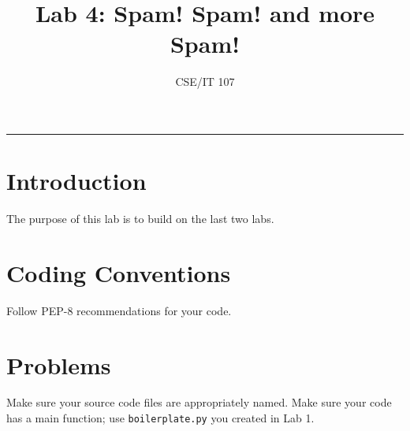 \documentclass[12pt]{article}
\title{Lab 4: Spam! Spam! and more Spam!}
\author{CSE/IT 107}
\date{}
\begin{document}
\maketitle


\hrule
\section{Introduction}

The purpose of this lab is to build on the last two labs. 



\section*{Coding Conventions}

Follow PEP-8 recommendations for your code. 

\section*{Problems}

Make sure your source code files are appropriately named. Make sure your code has a main function; use \texttt{boilerplate.py} you created in Lab 1.

\end{document}
